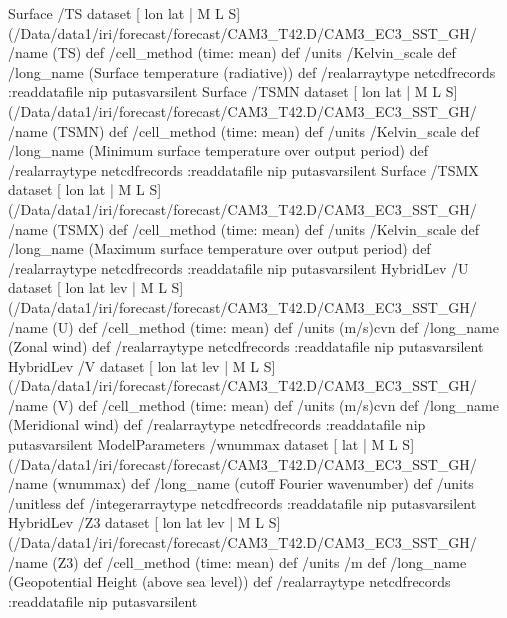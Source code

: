 \begin{ingrid}
Surface /TS{
dataset
[ lon lat | M L S] (/Data/data1/iri/forecast/forecast/CAM3_T42.D/CAM3_EC3_SST_GH/%
/name (TS) def
 /cell_method (time: mean) def
 /units /Kelvin_scale def
 /long_name (Surface temperature (radiative)) def
 /realarraytype netcdfrecords :readdatafile
nip
}putasvarsilent
Surface /TSMN{
dataset
[ lon lat | M L S] (/Data/data1/iri/forecast/forecast/CAM3_T42.D/CAM3_EC3_SST_GH/%
/name (TSMN) def
 /cell_method (time: mean) def
 /units /Kelvin_scale def
 /long_name (Minimum surface temperature over output period) def
 /realarraytype netcdfrecords :readdatafile
nip
}putasvarsilent
Surface /TSMX{
dataset
[ lon lat | M L S] (/Data/data1/iri/forecast/forecast/CAM3_T42.D/CAM3_EC3_SST_GH/%
/name (TSMX) def
 /cell_method (time: mean) def
 /units /Kelvin_scale def
 /long_name (Maximum surface temperature over output period) def
 /realarraytype netcdfrecords :readdatafile
nip
}putasvarsilent
HybridLev /U{
dataset
[ lon lat lev | M L S] (/Data/data1/iri/forecast/forecast/CAM3_T42.D/CAM3_EC3_SST_GH/%
/name (U) def
 /cell_method (time: mean) def
 /units (m/s)cvn def
 /long_name (Zonal wind) def
 /realarraytype netcdfrecords :readdatafile
nip
}putasvarsilent
HybridLev /V{
dataset
[ lon lat lev | M L S] (/Data/data1/iri/forecast/forecast/CAM3_T42.D/CAM3_EC3_SST_GH/%
/name (V) def
 /cell_method (time: mean) def
 /units (m/s)cvn def
 /long_name (Meridional wind) def
 /realarraytype netcdfrecords :readdatafile
nip
}putasvarsilent
ModelParameters /wnummax{
dataset
[ lat | M L S] (/Data/data1/iri/forecast/forecast/CAM3_T42.D/CAM3_EC3_SST_GH/%
/name (wnummax) def
 /long_name (cutoff Fourier wavenumber) def
 /units /unitless def
 /integerarraytype netcdfrecords :readdatafile
nip
}putasvarsilent
HybridLev /Z3{
dataset
[ lon lat lev | M L S] (/Data/data1/iri/forecast/forecast/CAM3_T42.D/CAM3_EC3_SST_GH/%
/name (Z3) def
 /cell_method (time: mean) def
 /units /m def
 /long_name (Geopotential Height (above sea level)) def
 /realarraytype netcdfrecords :readdatafile
nip
}putasvarsilent


\end{ingrid}